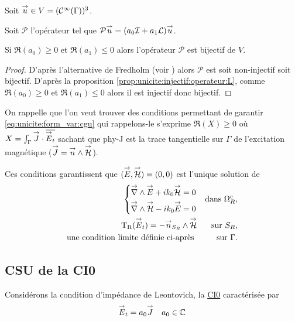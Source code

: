   \begin{prop}
    \label{prop:unicite:inversible:operateur:L}
    Soit \({\overset{\rightarrow}{u}} \in V=(\mathcal{C}^\infty(\Gamma))^3\).
    
    Soit \(\mathcal{P}\) l'opérateur tel que \(\mathcal{P}{\overset{\rightarrow}{u}} = (a_0{\mathcal{I}} + a_1 \mathcal{L}){\overset{\rightarrow}{u}}\).

    Si \(\Re(a_0)\ge 0\) et \(\Re(a_1)\le 0\) alors l'opérateur \(\mathcal{P}\) est bijectif de \(V\).
  \end{prop}
  \begin{proof}
    D'après l'alternative de Fredholm (voir \cite[Théorème~VI.6, p.~92]{brezis_analyse_1996})%
     alors \(\mathcal{P}\) est soit non-injectif soit bijectif. D'après la proposition \ref{prop:unicite:injectif:operateur:L}, comme \(\Re(a_0)\ge 0\) et \(\Re(a_1)\le 0\) alors il est injectif donc bijectif.
  \end{proof}


  On rappelle que l'on veut trouver des conditions permettant de garantir \eqref{eq:unicite:form_var:cgu} qui rappelons-le s'exprime \(\Re(X)\ge0\) où \(X = \int_\Gamma {\overset{\rightarrow}{J}} \cdot {\overline{{\overset{\rightarrow}{E}}_t}}\) sachant que \gls{phy-J} est la trace tangentielle sur \(\Gamma\) de l’excitation magnétique (\({\overset{\rightarrow}{J}} = {\overset{\rightarrow}{n}} \wedge {\overset{\rightarrow}{\mathcal{H}}}\)).

  Ces conditions garantissent que \(({\overset{\rightarrow}{E}},{\overset{\rightarrow}{\mathcal{H}}}) = (0,0)\) est l'unique solution de 
  \begin{equation}
    \label{eq:unicite:probleme_sans_ci}
    \begin{aligned}
      \left\lbrace
      \begin{aligned}
        {\overset{\rightarrow}{\nabla}}\wedge{{\overset{\rightarrow}{E}}} + ik_0{\overset{\rightarrow}{\mathcal{H}}} &= 0
        \\
        {\overset{\rightarrow}{\nabla}}\wedge{{\overset{\rightarrow}{\mathcal{H}}}} - ik_0{\overset{\rightarrow}{E}} &= 0
      \end{aligned}
      \right. && \text{dans \(\Omega^c_R\)},
      \\
      \operatorname{T_R}({\overset{\rightarrow}{E}}_t) = - {\overset{\rightarrow}{n}}_{S_R} \wedge {\overset{\rightarrow}{\mathcal{H}}} && \text{sur \(S_R\),}
      \\
      \text{une condition limite définie ci-après }  && \text{sur \(\Gamma\).}
    \end{aligned}
  \end{equation}

  \subsection{CSU de la CI0}
    Considérons la condition d’impédance de Leontovich, la \hyperlink{ci0}{CI0} caractérisée par
    \begin{align}
      \label{eq:unicite:ci0}
      {\overset{\rightarrow}{E}}_t = a_0 {\overset{\rightarrow}{J}} &&  a_0 \in \mathbb C
    \end{align}

